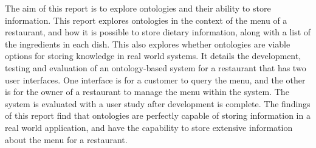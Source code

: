 \abstracttitle
%
{\singlespacing
The aim of this report is to explore ontologies and their ability to store information. This report explores ontologies in the context of the menu of a restaurant, and how it is possible to store dietary information, along with a list of the ingredients in each dish. This also explores whether ontologies are viable options for storing knowledge in real world systems. It details the development, testing and evaluation of an ontology-based system for a restaurant that has two user interfaces. One interface is for a customer to query the menu, and the other is for the owner of a restaurant to manage the menu within the system. The system is evaluated with a user study after development is complete. The findings of this report find that ontologies are perfectly capable of storing information in a real world application, and have the capability to store extensive information about the menu for a restaurant.
}

